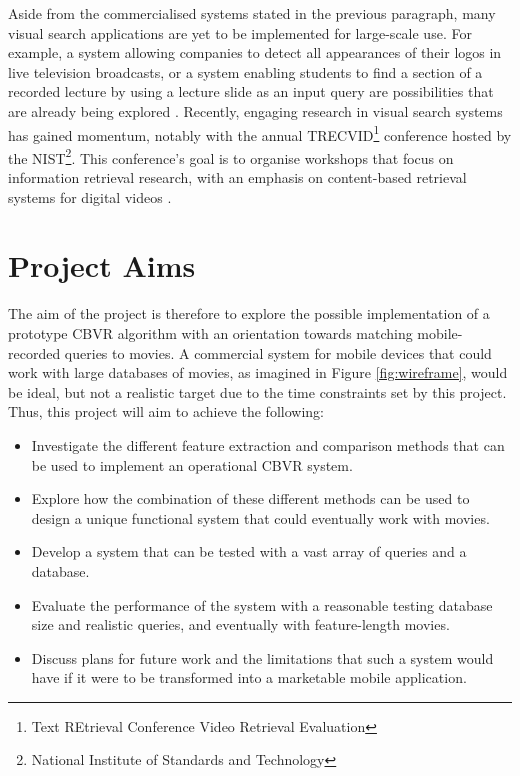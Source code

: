 Aside from the commercialised systems stated in the previous paragraph, many visual search applications are yet to be implemented for large-scale use. For example, a system allowing companies to detect all appearances of their logos in live television broadcasts, or a system enabling students to find a section of a recorded lecture by using a lecture slide as an input query are possibilities that are already being explored \cite{araujo2017i2v}.
Recently, engaging research in visual search systems has gained momentum, notably with the annual TRECVID\footnote{Text REtrieval Conference Video Retrieval Evaluation} conference \cite{2018trecvidawad} hosted by the NIST\footnote{National Institute of Standards and Technology}. This conference's goal is to organise workshops that focus on information retrieval research, with an emphasis on content-based retrieval systems for digital videos \cite{trecvid-general}.


\section{Project Aims}
\label{sec:introduction-project-aims}

The aim of the project is therefore to explore the possible implementation of a prototype CBVR algorithm with an orientation towards matching mobile-recorded queries to movies. A commercial system for mobile devices that could work with large databases of movies, as imagined in Figure \ref{fig:wireframe}, would be ideal, but not a realistic target due to the time constraints set by this project. Thus, this project will aim to achieve the following:

\begin{itemize}
    \item Investigate the different feature extraction and comparison methods that can be used to implement an operational CBVR system.
    \item Explore how the combination of these different methods can be used to design a unique functional system that could eventually work with movies.
    \item Develop a system that can be tested with a vast array of queries and a database.
    \item Evaluate the performance of the system with a reasonable testing database size and realistic queries, and eventually with feature-length movies.
    \item Discuss plans for future work and the limitations that such a system would have if it were to be transformed into a marketable mobile application.
\end{itemize}

